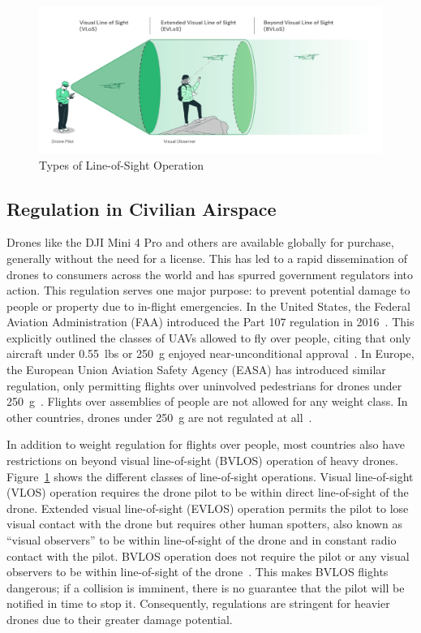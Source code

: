 \begin{figure}
    \centering
    \includegraphics[width=1.0\linewidth]{chapter2/FIGS/bvlos.jpg}
    \caption{Types of Line-of-Sight Operation~\cite{Flytbase}}
    \label{fig:bvlos}
\end{figure}

\subsection{Regulation in Civilian Airspace}
Drones like the DJI Mini 4 Pro and others are available globally for purchase, generally without the need for a license. This has led to a rapid dissemination of drones to consumers across the world and has spurred government regulators into action. This regulation serves one major purpose: to prevent potential damage to people or property due to in-flight emergencies. In the United States, the Federal Aviation Administration (FAA) introduced the Part 107 regulation in 2016~\cite{Flexairco}. This explicitly outlined the classes of UAVs allowed to fly over people, citing that only aircraft under 0.55~lbs or 250~g enjoyed near-unconditional approval~\cite{FAA2021}. In Europe, the European Union Aviation Safety Agency (EASA) has introduced similar regulation, only permitting flights over uninvolved pedestrians for drones under 250~g~\cite{EASA}. Flights over assemblies of people are not allowed for any weight class. In other countries, drones under 250~g are not regulated at all~\cite{IndiaRegulation,ChinaRegulation}.

In addition to weight regulation for flights over people, most countries also have restrictions on beyond visual line-of-sight (BVLOS) operation of heavy drones. Figure~\ref{fig:bvlos} shows the different classes of line-of-sight operations. Visual line-of-sight (VLOS) operation requires the drone pilot to be within direct line-of-sight of the drone. Extended visual line-of-sight (EVLOS) operation permits the pilot to lose visual contact with the drone but requires other human spotters, also known as ``visual observers'' to be within line-of-sight of the drone and in constant radio contact with the pilot. BVLOS operation does not require the pilot or any visual observers to be within line-of-sight of the drone~\cite{BVLOS}. This makes BVLOS flights dangerous; if a collision is imminent, there is no guarantee that the pilot will be notified in time to stop it. Consequently, regulations are stringent for heavier drones due to their greater damage potential.

